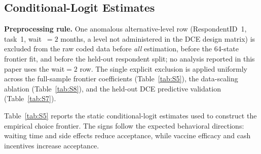 \documentclass[11pt]{article}
\begin{document}
\subsection{Conditional-Logit Estimates}

\textbf{Preprocessing rule.} One anomalous alternative-level row (RespondentID~1, task~1, wait~$=2$ months, a level not administered in the DCE design matrix) is excluded from the raw coded data before \emph{all} estimation, before the 64-state frontier fit, and before the held-out respondent split; no analysis reported in this paper uses the wait$=2$ row. The single explicit exclusion is applied uniformly across the full-sample frontier coefficients (Table~\ref{tab:S5}), the data-scaling ablation (Table~\ref{tab:S8}), and the held-out DCE predictive validation (Table~\ref{tab:S7}).

Table~\ref{tab:S5} reports the static conditional-logit estimates used to construct the empirical choice frontier. The signs follow the expected behavioral directions: waiting time and side effects reduce acceptance, while vaccine efficacy and cash incentives increase acceptance.
\end{document}
